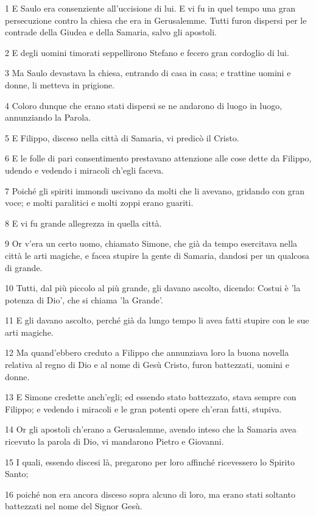 \par 1 E Saulo era consenziente all'uccisione di lui. E vi fu in quel tempo una gran persecuzione contro la chiesa che era in Gerusalemme. Tutti furon dispersi per le contrade della Giudea e della Samaria, salvo gli apostoli.
\par 2 E degli uomini timorati seppellirono Stefano e fecero gran cordoglio di lui.
\par 3 Ma Saulo devastava la chiesa, entrando di casa in casa; e trattine uomini e donne, li metteva in prigione.
\par 4 Coloro dunque che erano stati dispersi se ne andarono di luogo in luogo, annunziando la Parola.
\par 5 E Filippo, disceso nella città di Samaria, vi predicò il Cristo.
\par 6 E le folle di pari consentimento prestavano attenzione alle cose dette da Filippo, udendo e vedendo i miracoli ch'egli faceva.
\par 7 Poiché gli spiriti immondi uscivano da molti che li avevano, gridando con gran voce; e molti paralitici e molti zoppi erano guariti.
\par 8 E vi fu grande allegrezza in quella città.
\par 9 Or v'era un certo uomo, chiamato Simone, che già da tempo esercitava nella città le arti magiche, e facea stupire la gente di Samaria, dandosi per un qualcosa di grande.
\par 10 Tutti, dal più piccolo al più grande, gli davano ascolto, dicendo: Costui è 'la potenza di Dio', che si chiama 'la Grande'.
\par 11 E gli davano ascolto, perché già da lungo tempo li avea fatti stupire con le sue arti magiche.
\par 12 Ma quand'ebbero creduto a Filippo che annunziava loro la buona novella relativa al regno di Dio e al nome di Gesù Cristo, furon battezzati, uomini e donne.
\par 13 E Simone credette anch'egli; ed essendo stato battezzato, stava sempre con Filippo; e vedendo i miracoli e le gran potenti opere ch'eran fatti, stupiva.
\par 14 Or gli apostoli ch'erano a Gerusalemme, avendo inteso che la Samaria avea ricevuto la parola di Dio, vi mandarono Pietro e Giovanni.
\par 15 I quali, essendo discesi là, pregarono per loro affinché ricevessero lo Spirito Santo;
\par 16 poiché non era ancora disceso sopra alcuno di loro, ma erano stati soltanto battezzati nel nome del Signor Gesù.
